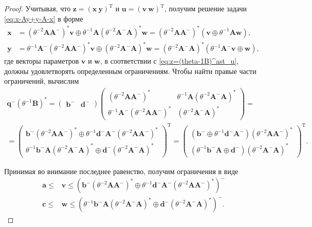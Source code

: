 \documentclass[specialist,
               substylefile = spbu.rtx,
               subf,href,colorlinks=true, 12pt]{disser}
\DeclareMathOperator{\T}{T}
\theoremstyle{definition}
\begin{document}
\begin{proof}
Учитывая, что 
$\bm{z}=(
\bm{x}~\bm{y})^{\T}$ 
и 
$\bm{u}=(
\bm{v}~\bm{w}
)^{\T}$,
 получим решение задачи \eqref{eq:x-Ay+y-A-x} в форме
\begin{align*}
\bm{x}
&=
(\theta^{-2}\bm{A}\bm{A}^{-})^{\ast}\bm{v}
\oplus
\theta^{-1}\bm{A}(\theta^{-2}\bm{A}^{-}\bm{A})^{\ast}\bm{w}
=
(\theta^{-2}\bm{A}\bm{A}^{-})^{\ast}(\bm{v}\oplus\theta^{-1}\bm{A}\bm{w})
,
\\
\bm{y}
&=
\theta^{-1}\bm{A}^{-}(\theta^{-2}\bm{A}\bm{A}^{-})^{\ast}\bm{v}
\oplus
(\theta^{-2}\bm{A}^{-}\bm{A})^{\ast}\bm{w}
=
(\theta^{-2}\bm{A}^{-}\bm{A})^{\ast}(\theta^{-1}\bm{A}^{-}\bm{v}\oplus\bm{w})
,
\end{align*}
где векторы параметров $\bm{v}$ и $\bm{w}$, в соответствии с \eqref{eq:z=(theta-1B)^ast_u}, должны удовлетворять определенным ограничениям.
Чтобы найти правые части ограничений, вычислим
\begin{gather*}
\bm{q}^{-}(\theta^{-1}\bm{B})^{\ast}
=
\begin{pmatrix}
\bm{b}^{-} &\bm{d}^{-}
\end{pmatrix}
\begin{pmatrix}
(\theta^{-2}\bm{A}\bm{A}^{-})^{\ast} &\theta^{-1}\bm{A}(\theta^{-2}\bm{A}^{-}\bm{A})^{\ast}\\
\theta^{-1}\bm{A}^{-}(\theta^{-2}\bm{A}\bm{A}^{-})^{\ast} &(\theta^{-2}\bm{A}^{-}\bm{A})^{\ast}
\end{pmatrix}
=\\=
\begin{pmatrix}
\bm{b}^{-}(\theta^{-2}\bm{A}\bm{A}^{-})^{\ast}
\oplus\theta^{-1}\bm{d}^{-}\bm{A}^{-}(\theta^{-2}\bm{A}\bm{A}^{-})^{\ast}\\
\theta^{-1}\bm{b}^{-}\bm{A}(\theta^{-2}\bm{A}^{-}\bm{A})^{\ast}
\oplus
\bm{d}^{-}(\theta^{-2}\bm{A}^{-}\bm{A})^{\ast}
\end{pmatrix}^{\T}
=
\begin{pmatrix}
(\bm{b}^{-}\oplus\theta^{-1}\bm{d}^{-}\bm{A}^{-})(\theta^{-2}\bm{A}\bm{A}^{-})^{\ast}\\
(\theta^{-1}\bm{b}^{-}\bm{A}\oplus\bm{d}^{-})(\theta^{-2}\bm{A}^{-}\bm{A})^{\ast}
\end{pmatrix}^{\T}.
\end{gather*}

Принимая во внимание последнее равенство, получим ограничения в виде
\begin{equation*}
\begin{aligned}
\bm{a}\leq&\bm{v}\leq
(\bm{b}^{-}(\theta^{-2}\bm{A}\bm{A}^{-})^{\ast}
\oplus\theta^{-1}\bm{d}^{-}\bm{A}^{-}(\theta^{-2}\bm{A}\bm{A}^{-})^{\ast})^{-}
\\
\bm{c}\leq&\bm{w}\leq
(\theta^{-1}\bm{b}^{-}\bm{A}(\theta^{-2}\bm{A}^{-}\bm{A})^{\ast}
\oplus
\bm{d}^{-}(\theta^{-2}\bm{A}^{-}\bm{A})^{\ast})^{-}.
\end{aligned}
\end{equation*}
\end{proof}
\end{document}
